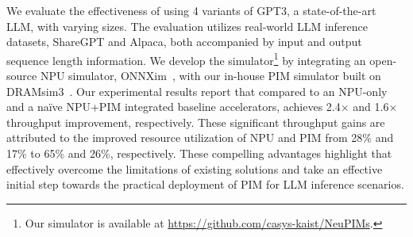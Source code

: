 We evaluate the effectiveness of \neupims using 4 variants of GPT3, a state-of-the-art LLM, with varying sizes. The evaluation utilizes real-world LLM inference datasets, ShareGPT and Alpaca, both accompanied by input and output sequence length information.
%
We develop the \neupims simulator\footnote{Our simulator is available at \url{https://github.com/casys-kaist/NeuPIMs}.} by integrating an open-source NPU simulator, ONNXim~\cite{onnxim}, with our in-house PIM simulator built on DRAMsim3~\cite{dramsim3}.
%
Our experimental results report that compared to an NPU-only and a na\"ive NPU+PIM integrated baseline accelerators, \neupims achieves 2.4$\times$ and 1.6$\times$ throughput improvement, respectively.
%
These significant throughput gains are attributed to the improved resource utilization of NPU and PIM from 28\% and 17\% to 65\% and 26\%, respectively.
%
These compelling advantages highlight that \neupims effectively overcome the limitations of existing solutions and take an effective initial step towards the practical deployment of PIM for LLM inference scenarios.